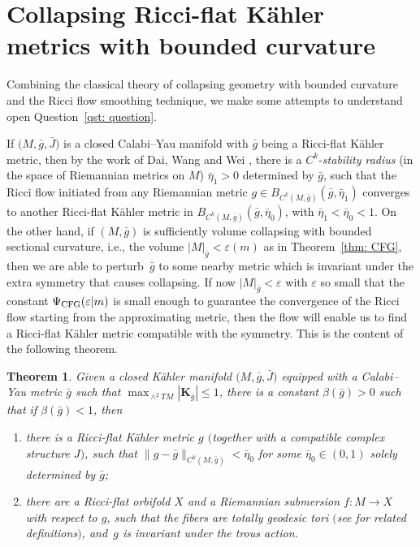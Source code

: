 \documentclass[pdftex]{sigma}
\numberwithin{equation}{section}
\newtheorem{Theorem}{Theorem}[section]
\begin{document}
\section{Collapsing Ricci-flat K\"ahler metrics with bounded curvature}\label{section5}
Combining the classical theory of collapsing geometry with bounded curvature
and the Ricci flow smoothing technique, we make some attempts to understand open Question~\ref{qst: question}.

If $\big(M,\bar{g},\bar{J}\big)$ is a closed Calabi--Yau manifold with $\bar{g}$ being a
Ricci-flat K\"ahler metric, then by the work of Dai, Wang and Wei \cite{DWW07},
there is a $C^k$-\emph{stability radius} (in the space of Riemannian metrics on
$M$) $\bar{\eta}_1>0$ determined by $\bar{g}$, such that the Ricci
flow initiated from any Riemannian metric $g\in
B_{C^k(M,\bar{g})}(\bar{g},\bar{\eta}_1)$ converges to another Ricci-flat
K\"ahler metric in $B_{C^k(M,\bar{g})}(\bar{g},\bar{\eta}_0)$, with
$\bar{\eta}_1<\bar{\eta}_0<1$. On the other hand, if $(M,\bar{g})$ is
sufficiently volume collapsing with bounded sectional curvature, i.e., the
volume $|M|_{\bar{g}}<\varepsilon(m)$ as in Theorem~\ref{thm: CFG}, then we are
able to perturb~$\bar{g}$ to some nearby metric which is invariant under the
extra symmetry that causes collapsing. If now $|M|_{\bar{g}}<\varepsilon$ with
$\varepsilon$ so small that the constant $\Psi_{\rm CFG}(\varepsilon|m)$ is small
enough to guarantee the convergence of the Ricci flow starting from the
approximating metric, then the flow will enable us to find a Ricci-flat
K\"ahler metric compatible with the symmetry. This is the content of the
following theorem.
\begin{Theorem}\label{thm: main}
Given a closed K\"ahler manifold $\big(M,\bar{g},\bar{J}\big)$ equipped with a
Calabi--Yau metric $\bar{g}$ such that
$\max_{\wedge^2TM} |\mathbf{K}_{\bar{g}} |\le 1$, there is a constant
$\beta(\bar{g})>0$ such that if $\beta(\bar{g})<1$, then
\begin{enumerate}\itemsep=0pt
 \item[$1)$] there is a Ricci-flat K\"ahler metric $g$ $($together with a compatible
 complex structure $J)$, such that $ \|g-\bar{g}
 \|_{C^k(M,\bar{g})} <\bar{\eta}_0$ for some $\bar{\eta}_0\in (0,1)$
 solely determined by $\bar{g}$;
 \item[$2)$] there are a Ricci-flat orbifold $X$ and a Riemannian submersion $f\colon M\to
 X$ with respect to $g$, such that the fibers are totally geodesic tori $($see
{\rm \cite[Section~7]{Fukaya89}} for related definitions$)$, and~$g$ is invariant under the
 trous action.
\end{enumerate}
\end{Theorem}
\end{document}
